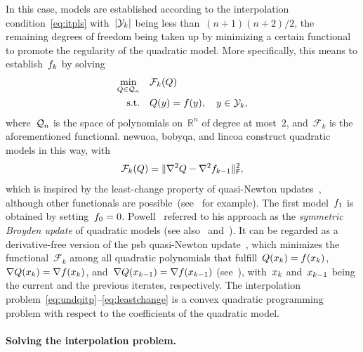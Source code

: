 \documentclass[
    smallextended,  %
    final,        %
]{svjour3}
\newcommand{\R}{\mathbb{R}}
\newcommand{\abs}[2][]{#1\lvert#2#1\rvert}
\newcommand{\frob}{\mathsf{F}}
\newcommand{\func}{\mathcal{F}}
\newcommand{\iter}[1][k]{x\ifthenelse{\equal{#1}{}}{}{_{#1}}}
\newcommand{\norm}[2][]{#1\lVert#2#1\rVert}
\newcommand{\objm}[1][k]{\obj\ifthenelse{\equal{#1}{}}{}{_{#1}}}
\newcommand{\obj}{f}
\newcommand{\qspace}[1][n]{\mathcal{Q}\ifthenelse{\equal{#1}{}}{}{_{#1}}}
\newcommand{\st}{\text{s.t.}}
\newcommand{\xpt}[1][k]{\mathcal{Y}\ifthenelse{\equal{#1}{}}{}{_{#1}}}
\begin{document}
In this case, models are established according to the interpolation condition~\eqref{eq:itpls}
with~$\abs{\xpt}$ being less than~$(n + 1)(n + 2) / 2$, the remaining degrees of freedom being taken up by minimizing a certain functional to promote the regularity of the quadratic model.
More specifically, this means to establish~$\objm$ by solving
\begin{equation}
    \label{eq:undqitp}
    \begin{split}
        \min_{Q \in \qspace}    & \quad \func_k(Q) \\
        \st                     & \quad Q(y) = \obj(y), \quad y \in \xpt,
    \end{split}
\end{equation}
where~$\qspace$ is the space of polynomials on~$\R^n$ of degree at most~$2$, and~$\func_k$ is the aforementioned functional.
\Gls{newuoa}, \gls{bobyqa}, and \gls{lincoa} construct quadratic models in this way, with
\begin{equation}
    \label{eq:leastchange}
    \func_k(Q) = \norm{\nabla^2 Q - \nabla^2 \objm[k - 1]}_{\frob}^2,
\end{equation}
which is inspired by the least-change property of quasi-Newton updates~\cite{Dennis_Schnabel_1979}, although other functionals are possible~(see~\cite{Conn_Toint_1996,Bandeira_Scheinberg_Vicente_2012,Powell_2013,Zhang_2014} for example).
The first model~$\objm[1]$ is obtained by setting~$\objm[0] = 0$.
Powell~\cite{Powell_2013} referred to his approach as the \emph{symmetric Broyden update} of
quadratic models (see also~\cite[\S~3.6]{Zhang_2012} and~\cite[\S~2.4.2]{Ragonneau_2022}).
It can be regarded as a derivative-free version of the \gls{psb} quasi-Newton update~\cite{Powell_1970b}, which minimizes the functional~$\func_k$ among all quadratic polynomials that fulfill~$Q(\iter) = \obj(\iter)$, $\nabla Q(\iter) = \nabla \obj(\iter)$, and~$\nabla Q(\iter[k - 1]) = \nabla \obj(\iter[k - 1])$ (see~\cite[Theorem~4.2]{Dennis_Schnabel_1979}), with~$\iter$ and~$\iter[k - 1]$ being the current and the previous iterates, respectively.
The interpolation problem~\mbox{\eqref{eq:undqitp}--\eqref{eq:leastchange}} is a convex quadratic
programming problem with respect to the coefficients of the quadratic model.

\paragraph{\textnormal{\textbf{Solving the interpolation problem.}}}
\end{document}
